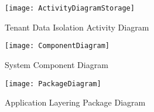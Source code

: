 \begin{figure}[htp]
\centering
\texttt{[image: ActivityDiagramStorage]}
\caption{Tenant Data Isolation Activity Diagram}
\label{fig:activitytenantisolation}
\end{figure}


\begin{figure}[htp]
\centering
\texttt{[image: ComponentDiagram]}
\caption{System Component Diagram}
\label{fig:componentdiagram}
\end{figure}


\begin{figure}[htp]
\centering
\texttt{[image: PackageDiagram]}
\caption{Application Layering Package Diagram}
\label{fig:packagediagram}
\end{figure}

